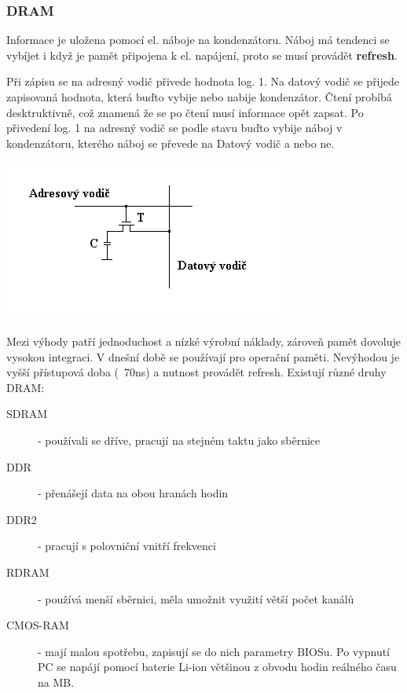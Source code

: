 \subsubsection{DRAM}
Informace je uložena pomocí el. náboje na kondenzátoru.
Náboj má tendenci se vybíjet i když je pamět připojena k el. napájení, proto se musí provádět \textbf{refresh}.
\begin{multicols}{2}
    Při zápisu se na adresný vodič přivede hodnota log. 1.
    Na datový vodič se přijede zapisovaná hodnota, která buďto vybije nebo nabije kondenzátor.
    Čtení probíbá desktruktivně, což znamená že se po čtení musí informace opět zapsat.
    Po přivedení log. 1 na adresný vodič se podle stavu buďto vybije náboj v kondenzátoru, kterého náboj se převede na Datový vodič a nebo ne.\\
    \columnbreak
        
    \includegraphics[width=0.8\linewidth]{TVY-POS/Polovodičové paměti/DRAM.png}
\end{multicols}
Mezi výhody patří jednoduchost a nízké výrobní náklady, zároveň pamět dovoluje vysokou integraci.
V dnešní době se používají pro operační paměti.
Nevýhodou je vyšší přístupová doba (~70ns) a nutnost provádět refresh.
Existují různé druhy DRAM:
\begin{description}
    \item[SDRAM]- používali se dříve, pracují na stejném taktu jako sběrnice 
    \item[DDR]- přenášejí data na obou hranách hodin
    \item[DDR2]- pracují s polovniční vnitří frekvenci 
    \item[RDRAM]- používá menší sběrnici, měla umožnit využití větší počet kanálů
    \item[CMOS-RAM]- mají malou spotřebu, zapisují se do nich parametry BIOSu. Po vypnutí PC se napájí pomocí baterie Li-ion většinou z obvodu hodin reálného času na MB.
\end{description}
